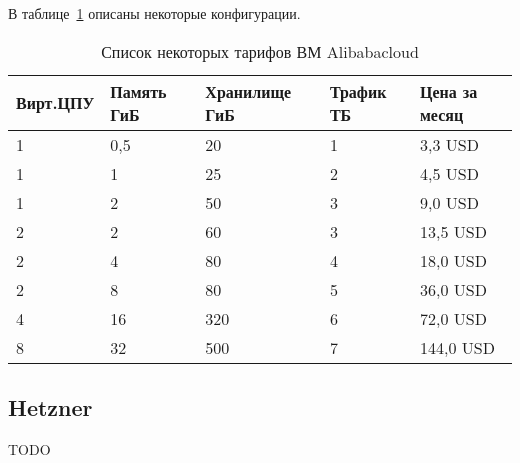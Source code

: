 В таблице~\ref{tab:alibabacloud_vps} описаны некоторые конфигурации.
\begin{table} [htbp]%
  \centering
  \begin{threeparttable}%
    \caption{Список некоторых тарифов ВМ Alibabacloud}
    \label{tab:alibabacloud_vps}%
    \renewcommand{\arraystretch}{1}%
    \begin{SingleSpace}
      \begin{tabular}{@{}@{\extracolsep{10pt}}lllll@{}}
        \toprule     %
          Вирт.ЦПУ & Память ГиБ & Хранилище ГиБ & Трафик ТБ & Цена за месяц \\
        \midrule %
          1 & 0,5 & 20 & 1 & 3,3 USD \\
          1 & 1 & 25 & 2 & 4,5 USD \\
          1 & 2 & 50 & 3 & 9,0 USD \\
          2 & 2 & 60 & 3 & 13,5 USD \\
          2 & 4 & 80 & 4 & 18,0 USD \\
          2 & 8 & 80 & 5 & 36,0 USD \\
          4 & 16 & 320 & 6 & 72,0 USD \\
          8 & 32 & 500 & 7 & 144,0 USD \\
        \bottomrule %
      \end{tabular}%
    \end{SingleSpace}
  \end{threeparttable}
\end{table}

\subsection{Hetzner}\label{sec:hetzner}
TODO